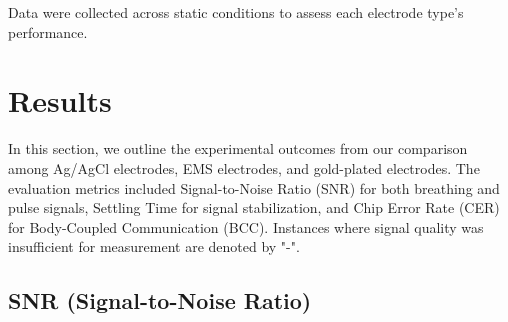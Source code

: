\documentclass[conference]{IEEEtran}
\newcommand{\notea}[1]{\textcolor{blue}{Armands: #1}}
\begin{document}
Data were collected across static conditions to assess each electrode type's performance.




    



%

\section{Results}

In this section, we outline the experimental outcomes from our comparison among Ag/AgCl electrodes, EMS electrodes, and gold-plated electrodes. The evaluation metrics included Signal-to-Noise Ratio (SNR) for both breathing and pulse signals, Settling Time for signal stabilization, and Chip Error Rate (CER) for Body-Coupled Communication (BCC). Instances where signal quality was insufficient for measurement are denoted by "-".

\subsection{SNR (Signal-to-Noise Ratio)}
\end{document}
